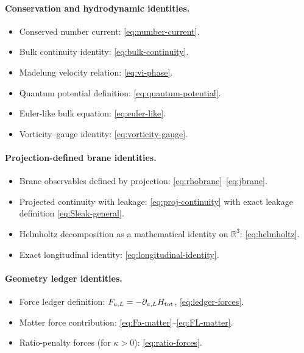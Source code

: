 \documentclass[11pt]{article}
\begin{document}
\paragraph{Conservation and hydrodynamic identities.}
\begin{itemize}[leftmargin=2.0em]
\item Conserved number current: \eqref{eq:number-current}.
\item Bulk continuity identity: \eqref{eq:bulk-continuity}.
\item Madelung velocity relation: \eqref{eq:vi-phase}.
\item Quantum potential definition: \eqref{eq:quantum-potential}.
\item Euler-like bulk equation: \eqref{eq:euler-like}.
\item Vorticity--gauge identity: \eqref{eq:vorticity-gauge}.
\end{itemize}

\paragraph{Projection-defined brane identities.}
\begin{itemize}[leftmargin=2.0em]
\item Brane observables defined by projection: \eqref{eq:rhobrane}--\eqref{eq:jbrane}.
\item Projected continuity with leakage: \eqref{eq:proj-continuity} with exact leakage definition \eqref{eq:Sleak-general}.
\item Helmholtz decomposition as a mathematical identity on $\mathbb{R}^3$: \eqref{eq:helmholtz}.
\item Exact longitudinal identity: \eqref{eq:longitudinal-identity}.
\end{itemize}

\paragraph{Geometry ledger identities.}
\begin{itemize}[leftmargin=2.0em]
\item Force ledger definition: $F_{a,L}=-\partial_{a,L}H_{\rm tot}$, \eqref{eq:ledger-forces}.
\item Matter force contribution: \eqref{eq:Fa-matter}--\eqref{eq:FL-matter}.
\item Ratio-penalty forces (for $\kappa>0$): \eqref{eq:ratio-forces}.
\end{itemize}
\end{document}
